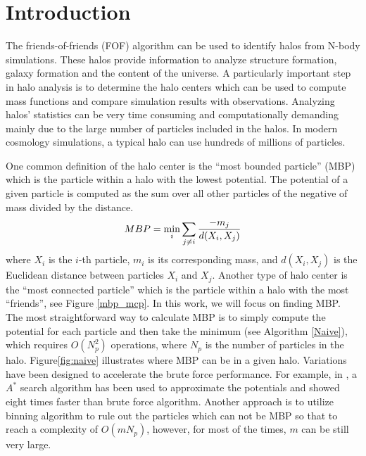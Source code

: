 
\section{Introduction}
\label{sec:intro}
The friends-of-friends (FOF) algorithm can be used to identify halos from N-body simulations. These halos provide information to analyze structure formation, galaxy formation and the content of the universe. A particularly important step in halo analysis is to determine the halo centers which can be used to compute mass functions and compare simulation results with observations. 
Analyzing halos' statistics can be very time consuming and computationally demanding mainly due to the large number of particles included in the halos. In modern cosmology simulations, a typical halo can use hundreds of millions of particles.  

One common definition of the halo center is the ``most bounded particle'' (MBP) which is the particle within a halo with the lowest potential. The potential of a given particle is computed as the sum over all other particles of the negative of mass divided by the distance.  
 \[ MBP=\min_i \displaystyle\sum_{j\neq i}\frac{-m_j}{d(X_i,X_j)}\]
 where $X_i$ is the $i$-th particle, $m_i$ is its corresponding mass, and $d(X_i,X_j)$ is the Euclidean distance between particles $X_i$ and $X_j$. Another type of halo center is the ``most connected particle'' which is the particle within a halo with the most ``friends'', see Figure \ref{mbp_mcp}. In this work, we will focus on finding MBP. The most straightforward way to calculate MBP is to simply compute the potential for each particle and then take the minimum (see Algorithm \ref{Naive}), which requires $O(N_p^2)$ operations, where $N_p$ is the number of particles in the halo. Figure\ref{fig:naive} illustrates where MBP can be in a given halo. Variations have been designed to accelerate the brute force performance. For example, in \cite{fasel2011cosmology}, a $A^{*}$ search algorithm has been used to approximate the potentials and showed eight times faster than brute force algorithm. Another approach is to utilize binning algorithm to rule out the particles which can not be MBP so that to reach a complexity of $O(mN_p)$, however, for most of the times, $m$ can be still very large. 

